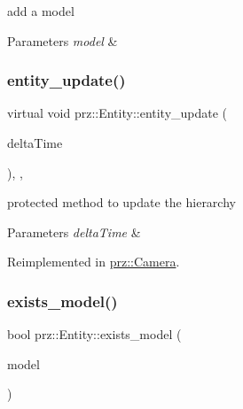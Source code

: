 add a model 


\begin{DoxyParams}{Parameters}
{\em model} & \\
\hline
\end{DoxyParams}
\mbox{\label{classprz_1_1_entity_abf4cb73b801b239f61535eec0505b26d}} 
\subsubsection{\texorpdfstring{entity\_update()}{entity\_update()}}
{\footnotesize\ttfamily virtual void prz\+::\+Entity\+::entity\+\_\+update (\begin{DoxyParamCaption}\item[{float}]{delta\+Time }\end{DoxyParamCaption})\hspace{0.3cm}{\ttfamily [inline]}, {\ttfamily [protected]}, {\ttfamily [virtual]}}



protected method to update the hierarchy 


\begin{DoxyParams}{Parameters}
{\em delta\+Time} & \\
\hline
\end{DoxyParams}


Reimplemented in \mbox{\hyperlink{classprz_1_1_camera_abea73c7221f27991b3c2790e71feaf3b}{prz\+::\+Camera}}.

\mbox{\label{classprz_1_1_entity_a8d9500acb1c61a571864b2e4217a48cc}} 
\subsubsection{\texorpdfstring{exists\_model()}{exists\_model()}}
{\footnotesize\ttfamily bool prz\+::\+Entity\+::exists\+\_\+model (\begin{DoxyParamCaption}\item[{P\+S\+Ptr$<$ \mbox{\hyperlink{classprz_1_1_model}{Model}} $>$}]{model }\end{DoxyParamCaption})\hspace{0.3cm}{\ttfamily [inline]}}




